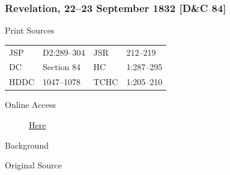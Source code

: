 		\subsubsection{Revelation, 22--23 September 1832 [D\&C 84]}
			\label{EMS-1832-JS-22-23-SEP-1832}
		
			\begin{description}
				\item[Print Sources]
			\end{description}

				\begin{tabular}{p{0.5in}p{1in}p{0.5in}p{1in}}
				JSP	 	& D2:289--304	& JSR 		& 212--219 \\
				DC	 	& Section 84 	& HC 		& 1:287--295 \\
				HDDC 	& 1047--1078	& TCHC 		& 1:205--210 \\
				\end{tabular}
			
			\begin{description}
				\item[Online Access] \href{https://www.josephsmithpapers.org/paper-summary/revelation-22-23-september-1832-dc-84/1}{Here}
			\end{description}
			
			\begin{description}
				\item[Background]
			\end{description}
			
			
			\begin{description}
				\item[Original Source]
			\end{description}
			
			

